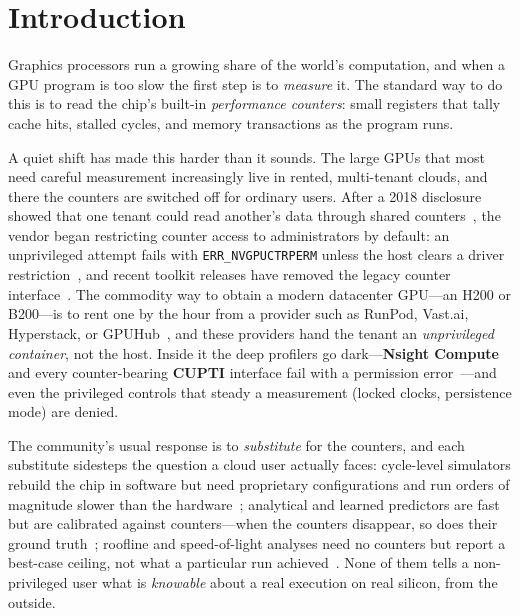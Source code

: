 \documentclass[conference]{IEEEtran}
\begin{document}
\section{Introduction}

Graphics processors run a growing share of the world's computation, and when a
GPU program is too slow the first step is to \emph{measure} it. The standard
way to do this is to read the chip's built-in \emph{performance counters}:
small registers that tally cache hits, stalled cycles, and memory transactions
as the program runs.

A quiet shift has made this harder than it sounds. The large GPUs that most need
careful measurement increasingly live in rented, multi-tenant clouds, and there
the counters are switched off for ordinary users. After a 2018 disclosure showed
that one tenant could read another's data through shared
counters~\cite{naghibijouybari2018rendered,cve_2018_6260}, the vendor began restricting counter access to
administrators by default: an unprivileged attempt fails with
\texttt{ERR\_NVGPUCTRPERM} unless the host clears a driver
restriction~\cite{nvidia_errnvgpuctrperm}, and recent toolkit releases have
removed the legacy counter interface~\cite{nvidia_cupti}. The commodity way to obtain a modern datacenter
GPU---an H200 or B200---is to rent one by the hour from a provider such as
RunPod, Vast.ai, Hyperstack, or GPUHub~\cite{cloudgpu_containers}, and these
providers hand the tenant an \emph{unprivileged container}, not the host.
Inside it the deep profilers go dark---\textbf{Nsight Compute} and every
counter-bearing \textbf{CUPTI} interface fail with a permission
error~\cite{nvidia_nsightcompute,nvidia_cupti}---and even the privileged
controls that steady a measurement (locked clocks, persistence mode) are
denied.

The community's usual response is to \emph{substitute} for the counters, and
each substitute sidesteps the question a cloud user actually faces:
cycle-level simulators rebuild the chip in software but need proprietary
configurations and run orders of magnitude slower than the
hardware~\cite{bakhoda2009gpgpusim,khairy2020accelsim,villa2021nvarchsim};
analytical and learned predictors are fast but are calibrated against
counters---when the counters disappear, so does their ground
truth~\cite{hong2009analytical,lee2022gcom}; roofline and
speed-of-light analyses need no counters but report a best-case ceiling, not
what a particular run achieved~\cite{williams2009roofline}. None of them tells
a non-privileged user what is \emph{knowable} about a real execution on real
silicon, from the outside.
\end{document}
